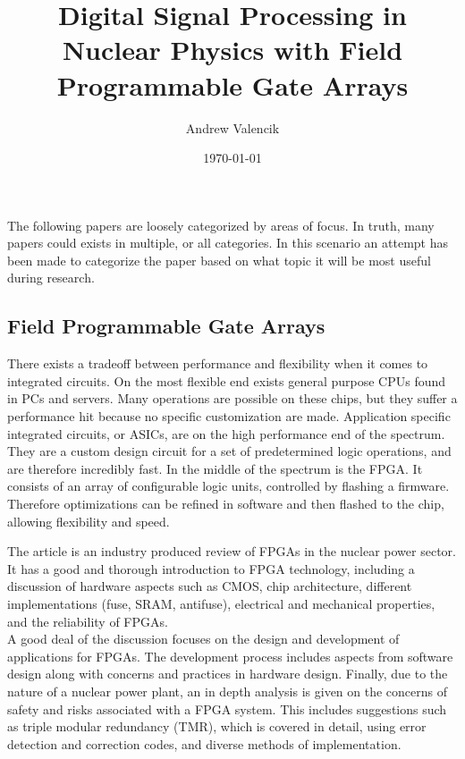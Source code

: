 \documentclass[12pt]{article}
\begin{document}
\title{Digital Signal Processing in Nuclear Physics with Field Programmable Gate Arrays}

\author{Andrew Valencik}

\date{\today}

\maketitle


The following papers are loosely categorized by areas of focus. In truth, many papers could exists in multiple, or all categories. In this scenario an attempt has been made to categorize the paper based on what topic it will be most useful during research.

\begin{doublespacing}

\section{Field Programmable Gate Arrays}   %
There exists a tradeoff between performance and flexibility when it comes to integrated circuits. On the most flexible end exists general purpose CPUs found in PCs and servers. Many operations are possible on these chips, but they suffer a performance hit because no specific customization are made. Application specific integrated circuits, or ASICs, are on the high performance end of the spectrum. They are a custom design circuit for a set of predetermined logic operations, and are therefore incredibly fast. In the middle of the spectrum is the FPGA. It consists of an array of configurable logic units, controlled by flashing a firmware. Therefore optimizations can be refined in software and then flashed to the chip, allowing flexibility and speed.
\\[20pt]

{\large\textbf{\cite{currentState}}}

The article is an industry produced review of FPGAs in the nuclear power sector. It has a good and thorough introduction to FPGA technology, including a discussion of hardware aspects such as CMOS, chip architecture, different implementations (fuse, SRAM, antifuse), electrical and mechanical properties, and the reliability of FPGAs.
\\
A good deal of the discussion focuses on the design and development of applications for FPGAs. The development process includes aspects from software design along with concerns and practices in hardware design. Finally, due to the nature of a nuclear power plant, an in depth analysis is given on the concerns of safety and risks associated with a FPGA system. This includes suggestions such as triple modular redundancy (TMR), which is covered in detail, using error detection and correction codes, and diverse methods of implementation.
\\[20pt]


\end{doublespacing}
\end{document}
